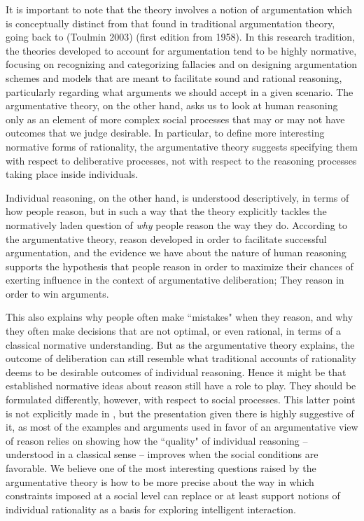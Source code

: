 \documentclass{article}
\begin{document}
It is important to note that the theory involves a notion of argumentation which is conceptually distinct from that found in traditional argumentation theory, going back to (Toulmin 2003) (first edition from 1958). In this research tradition, the theories developed to account for argumentation tend to be highly normative, focusing on recognizing and categorizing fallacies and on designing argumentation schemes and models that are meant to facilitate sound and rational reasoning, particularly regarding what arguments we should accept in a given scenario. The argumentative theory, on the other hand, asks us to look at human reasoning only as an element of more complex social processes that may or may not have outcomes that we judge desirable. In particular, to define more interesting normative forms of rationality, the argumentative theory suggests specifying them with respect to deliberative processes, not with respect to the reasoning processes taking place inside individuals.

Individual reasoning, on the other hand, is understood descriptively, in terms of how people reason, but in such a way that the theory explicitly tackles the normatively laden question of \emph{why} people reason the way they do. According to the argumentative theory, reason developed in order to facilitate successful argumentation, and the evidence we have about the nature of human reasoning supports the hypothesis that people reason in order to maximize their chances of exerting influence in the context of argumentative deliberation; They reason in order to win arguments.

This also explains why people often make ``mistakes" when they reason, and why they often make decisions that are not optimal, or even rational, in terms of a classical normative understanding. But as the argumentative theory explains, the outcome of deliberation can still resemble what traditional accounts of rationality deems to be desirable outcomes of individual reasoning. Hence it might be that established normative ideas about reason still have a role to play. They should be formulated differently, however, with respect to social processes. This latter point is not explicitly made in \cite{whyreason}, but the presentation given there is highly suggestive of it, as most of the examples and arguments used in favor of an argumentative view of reason relies on showing how the ``quality" of individual reasoning -- understood in a classical sense -- improves when the social conditions are favorable. We believe one of the most interesting questions raised by the argumentative theory is how to be more precise about the way in which constraints imposed at a social level can replace or at least support notions of individual rationality as a basis for exploring intelligent interaction.
\end{document}
